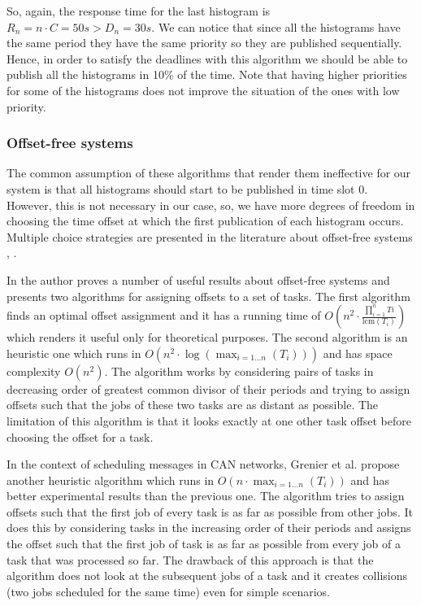 So, again, the response time for the last histogram is $R_n=n\cdot C=50s > D_n=30s$. We can notice that since all the histograms have the same period they have the same priority so they are published sequentially. Hence, in order to satisfy the deadlines with this algorithm we should be able to publish all the histograms in 10\% of the time. Note that having higher priorities for some of the histograms does not improve the situation of the ones with low priority.

\subsubsection*{Offset-free systems} 

The common assumption of these algorithms that render them ineffective for our system is that all histograms should start to be published in time slot 0. However, this is not necessary in our case, so, we have more degrees of freedom in choosing the time offset at which the first publication of each histogram occurs. Multiple choice strategies are presented in the literature about offset-free systems \citep{goossens2003scheduling}, \citep{grenier2008pushing}.
 
In \citep{goossens2003scheduling} the author proves a number of useful results about offset-free systems and presents two algorithms for assigning offsets to a set of tasks. The first algorithm finds an optimal offset assignment and it has a running time of $O(n^2 \cdot \frac{\prod_{i=1}^n Ti}{\text{lcm}(T_i)})$ which renders it useful only for theoretical purposes. The second algorithm is an heuristic one which runs in $O(n^2\cdot \log(\max_{i=1\ldots n}(T_i)))$ and has space complexity $O(n^2)$. The algorithm works by considering pairs of tasks in decreasing order of greatest common divisor of their periods and trying to assign offsets such that the jobs of these two tasks are as distant as possible. The limitation of this algorithm is that it looks exactly at one other task offset before choosing the offset for a task.

In the context of scheduling messages in CAN networks, Grenier et al. \citep{grenier2008pushing} propose another heuristic algorithm which runs in $O(n\cdot \max_{i=1 \ldots n}(T_i))$ and has better experimental results than the previous one. The algorithm tries to assign offsets such that the first job of every task is as far as possible from other jobs. It does this by considering tasks in the increasing order of their periods and assigns the offset such that the first job of task is as far as possible from every job of a task that was processed so far. The drawback of this approach is that the algorithm does not look at the subsequent jobs of a task and it creates collisions (two jobs scheduled for the same time) even for simple scenarios.

